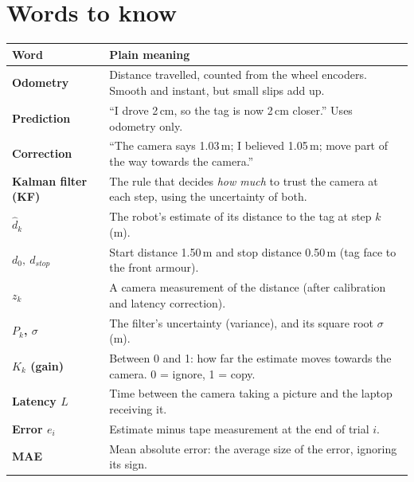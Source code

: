 \documentclass[11pt,a4paper]{article}
\begin{document}
\section{Words to know}
\begin{center}\small
\begin{tabularx}{\linewidth}{@{}>{\bfseries}p{3.6cm}X@{}}
\toprule
\textnormal{\textbf{Word}} & \textbf{Plain meaning}\\
\midrule
Odometry & Distance travelled, counted from the wheel encoders. Smooth and instant, but small slips add up.\\
Prediction & ``I drove 2\,cm, so the tag is now 2\,cm closer.'' Uses odometry only.\\
Correction & ``The camera says 1.03\,m; I believed 1.05\,m; move part of the way towards the camera.''\\
Kalman filter (KF) & The rule that decides \emph{how much} to trust the camera at each step, using the uncertainty of both.\\
$\hat d_k$ & The robot's estimate of its distance to the tag at step $k$ (m).\\
$d_0,\ d_{stop}$ & Start distance 1.50\,m and stop distance 0.50\,m (tag face to the front armour).\\
$z_k$ & A camera measurement of the distance (after calibration and latency correction).\\
$P_k$, $\sigma$ & The filter's uncertainty (variance), and its square root $\sigma$ (m).\\
$K_k$ (gain) & Between 0 and 1: how far the estimate moves towards the camera. 0 = ignore, 1 = copy.\\
Latency $L$ & Time between the camera taking a picture and the laptop receiving it.\\
Error $e_i$ & Estimate minus tape measurement at the end of trial $i$.\\
MAE & Mean absolute error: the average size of the error, ignoring its sign.\\
\bottomrule
\end{tabularx}
\end{center}

\end{document}
